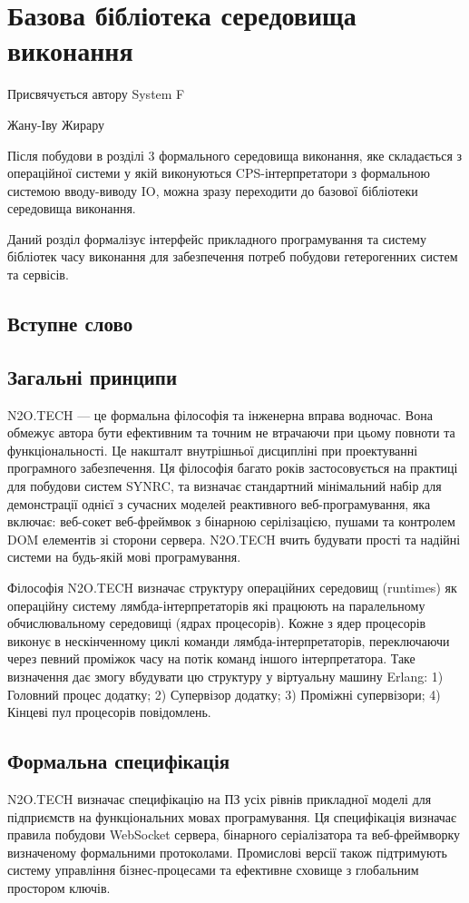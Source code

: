 \chapter{Базова бібліотека середовища виконання}
\epigraph{Присвячується автору System F}{Жану-Іву Жирару}

Після побудови в розділі 3 формального середовища виконання,
яке складається з операційної системи у якій виконуються
CPS-інтерпретатори з формальною системою вводу-виводу IO, можна зразу
переходити до базової бібліотеки середовища виконання.

Даний розділ формалізує інтерфейс прикладного програмування та систему
бібліотек часу виконання для забезпечення потреб побудови гетерогенних систем та сервісів.

\section*{Вступне слово}

\section{Загальні принципи}
N2O.TECH — це формальна філософія та інженерна вправа водночас.
Вона обмежує автора бути ефективним та точним не втрачаючи
при цьому повноти та функціональності. Це накшталт внутрішньої
дисципліні при проектуванні програмного забезпечення. Ця філософія
багато років застосовується на практиці для побудови систем SYNRC,
та визначає стандартний мінімальний набір для демонстрації однієї
з сучасних моделей реактивного веб-програмування, яка включає: веб-сокет
веб-фреймвок з бінарною серілізацією, пушами та контролем DOM елементів
зі сторони сервера. N2O.TECH вчить будувати прості та надійні системи
на будь-якій мові програмування.

Філософія N2O.TECH визначає структуру операційних середовищ (runtimes) як
операційну систему лямбда-інтерпретаторів які працюють на паралельному
обчислювальному середовищі (ядрах процесорів). Кожне з ядер процесорів
виконує в нескінченному циклі команди лямбда-інтерпретаторів, переключаючи
через певний проміжок часу на потік команд іншого інтерпретатора. Таке
визначення дає змогу вбудувати цю структуру у віртуальну машину Erlang:
1) Головний процес додатку; 2) Супервізор додатку; 3) Проміжні
супервізори; 4) Кінцеві пул процесорів повідомлень.

\section{Формальна специфікація}
N2O.TECH визначає специфікацію на ПЗ усіх рівнів прикладної моделі
для підприємств на функціональних мовах програмування. Ця
специфікація визначає правила побудови WebSocket сервера,
бінарного серіалізатора та веб-фреймворку визначеному
формальними протоколами. Промислові версії також підтримують
систему управління бізнес-процесами та ефективне сховище
з глобальним простором ключів.


